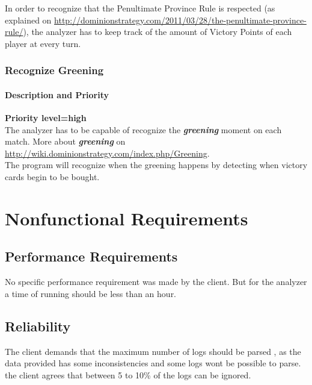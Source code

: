 \documentclass{scrreprt}
\begin{document}
In order to recognize that the Penultimate Province Rule is respected (as explained on \url{http://dominionstrategy.com/2011/03/28/the-penultimate-province-rule/}), the analyzer has to keep track of the amount of Victory Points of each player at every turn.

\subsection{Recognize Greening}
\subsubsection{Description and Priority}
\textbf{Priority level=high}\\
The analyzer has to be capable of recognize the \textit{\textbf{greening}} moment on each match.
More about \textit{\textbf{greening}} on \url{http://wiki.dominionstrategy.com/index.php/Greening}.\\
The program will recognize when the greening happens by detecting when victory cards begin to be bought.


\chapter{Nonfunctional Requirements}

\section{Performance Requirements}
No specific performance requirement was made by the client. But for the analyzer
a time of running should be less than an hour.



\section{Reliability}
The client demands that the maximum number of logs should be parsed , as the
data provided has some inconsistencies and some logs wont be possible to parse.
the client agrees that between 5 to 10\% of the logs can be ignored.\\
\end{document}
